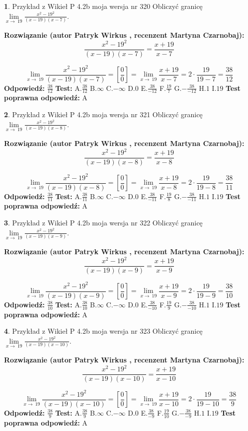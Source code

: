 \documentclass[12pt, a4paper]{article}
\theoremstyle{definition} %
\newtheorem{zad}{}
\newcommand{\zadStart}[1]{\begin{zad}#1\newline}
\newcommand{\zadStop}{\end{zad}}
\newcommand{\rozwStart}[2]{\noindent \textbf{Rozwiązanie (autor #1 , recenzent #2): }\newline}
\newcommand{\rozwStop}{\newline}
\newcommand{\odpStart}{\noindent \textbf{Odpowiedź:}\newline}
\newcommand{\odpStop}{\newline}
\newcommand{\testStart}{\noindent \textbf{Test:}\newline}
\newcommand{\testStop}{\newline}
\newcommand{\kluczStart}{\noindent \textbf{Test poprawna odpowiedź:}\newline}
\newcommand{\kluczStop}{\newline}
\begin{document}
\zadStart{Przykład z Wikieł P 4.2b moja wersja nr 320}
Obliczyć granicę $\lim\limits_{x\to\ 19}\frac{x^{2}-19^{2}}{(x-19)(x-7)}$.
\zadStop
\rozwStart{Patryk Wirkus}{Martyna Czarnobaj}
$$\frac{x^{2}-19^{2}}{(x-19)(x-7)}=\frac{x+19}{x-7}$$

$$\lim\limits_{x\to\ 19}\frac{x^{2}-19^{2}}{(x-19)(x-7)}=[\frac{0}{0}]=\lim\limits_{x\to\ 19}\frac{x+19}{x-7}=2 \cdot \frac{19}{19-7} = \frac{38}{12}$$
\rozwStop
\odpStart
$\frac{38}{12}$
\odpStop
\testStart
A.$\frac{38}{12}$
B.$\infty$
C.$-\infty$
D.$0$
E.$\frac{38}{-12}$
F.$\frac{19}{7}$
G.$-\frac{38}{-12}$
H.$1$
I.$19$
\testStop
\kluczStart
A
\kluczStop



\zadStart{Przykład z Wikieł P 4.2b moja wersja nr 321}
Obliczyć granicę $\lim\limits_{x\to\ 19}\frac{x^{2}-19^{2}}{(x-19)(x-8)}$.
\zadStop
\rozwStart{Patryk Wirkus}{Martyna Czarnobaj}
$$\frac{x^{2}-19^{2}}{(x-19)(x-8)}=\frac{x+19}{x-8}$$

$$\lim\limits_{x\to\ 19}\frac{x^{2}-19^{2}}{(x-19)(x-8)}=[\frac{0}{0}]=\lim\limits_{x\to\ 19}\frac{x+19}{x-8}=2 \cdot \frac{19}{19-8} = \frac{38}{11}$$
\rozwStop
\odpStart
$\frac{38}{11}$
\odpStop
\testStart
A.$\frac{38}{11}$
B.$\infty$
C.$-\infty$
D.$0$
E.$\frac{38}{-11}$
F.$\frac{19}{8}$
G.$-\frac{38}{-11}$
H.$1$
I.$19$
\testStop
\kluczStart
A
\kluczStop



\zadStart{Przykład z Wikieł P 4.2b moja wersja nr 322}
Obliczyć granicę $\lim\limits_{x\to\ 19}\frac{x^{2}-19^{2}}{(x-19)(x-9)}$.
\zadStop
\rozwStart{Patryk Wirkus}{Martyna Czarnobaj}
$$\frac{x^{2}-19^{2}}{(x-19)(x-9)}=\frac{x+19}{x-9}$$

$$\lim\limits_{x\to\ 19}\frac{x^{2}-19^{2}}{(x-19)(x-9)}=[\frac{0}{0}]=\lim\limits_{x\to\ 19}\frac{x+19}{x-9}=2 \cdot \frac{19}{19-9} = \frac{38}{10}$$
\rozwStop
\odpStart
$\frac{38}{10}$
\odpStop
\testStart
A.$\frac{38}{10}$
B.$\infty$
C.$-\infty$
D.$0$
E.$\frac{38}{-10}$
F.$\frac{19}{9}$
G.$-\frac{38}{-10}$
H.$1$
I.$19$
\testStop
\kluczStart
A
\kluczStop



\zadStart{Przykład z Wikieł P 4.2b moja wersja nr 323}
Obliczyć granicę $\lim\limits_{x\to\ 19}\frac{x^{2}-19^{2}}{(x-19)(x-10)}$.
\zadStop
\rozwStart{Patryk Wirkus}{Martyna Czarnobaj}
$$\frac{x^{2}-19^{2}}{(x-19)(x-10)}=\frac{x+19}{x-10}$$

$$\lim\limits_{x\to\ 19}\frac{x^{2}-19^{2}}{(x-19)(x-10)}=[\frac{0}{0}]=\lim\limits_{x\to\ 19}\frac{x+19}{x-10}=2 \cdot \frac{19}{19-10} = \frac{38}{9}$$
\rozwStop
\odpStart
$\frac{38}{9}$
\odpStop
\testStart
A.$\frac{38}{9}$
B.$\infty$
C.$-\infty$
D.$0$
E.$\frac{38}{-9}$
F.$\frac{19}{10}$
G.$-\frac{38}{-9}$
H.$1$
I.$19$
\testStop
\kluczStart
A
\kluczStop
\end{document}
